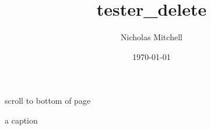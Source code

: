 \documentclass{article}
\author{Nicholas Mitchell}
\date{\today}
\title{tester\_delete}
\begin{document}
\maketitle
\tableofcontents

\begin{algorithm}[H]
   {
      scroll to bottom of page\;
  }
  \caption{a caption}
\end{algorithm}
\end{document}
